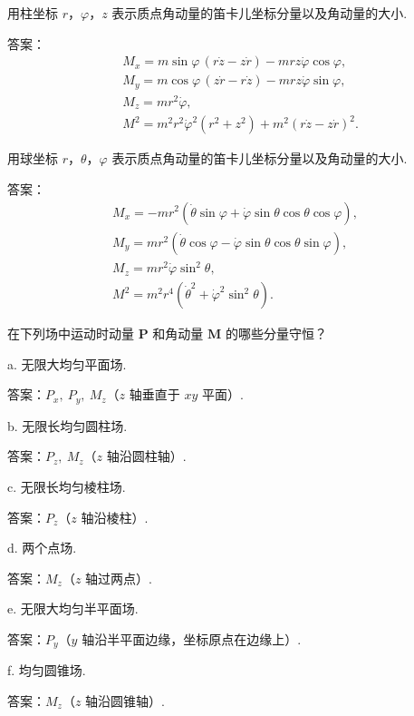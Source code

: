 \begin{xiti}

\quad 用柱坐标 $r$，$\varphi$，$z$ 表示质点角动量的笛卡儿坐标分量以及角动量的大小.

答案：
\begin{equation*}
\begin{aligned}
  &M_x=m\sin\varphi\,(r\dot{z}-z\dot{r})-mrz\dot{\varphi}\cos\varphi,\\
  &M_y=m\cos\varphi\,(z\dot{r}-r\dot{z})-mrz\dot{\varphi}\sin\varphi,\\
  &M_z=mr^2\dot{\varphi},\\
  &M^2=m^2r^2\dot{\varphi}^2\left(r^2+z^2\right)+m^2(r\dot{z}-z\dot{r})^2.
\end{aligned}
\end{equation*}

\quad 用球坐标 $r$，$\theta$，$\varphi$ 表示质点角动量的笛卡儿坐标分量以及角动量的大小.

答案：
\begin{gather*}
  M_x=-mr^2\left(\dot{\theta}\sin\varphi
  +\dot{\varphi}\sin\theta\cos\theta\cos\varphi\right),\\
  M_y=mr^2\left(\dot{\theta}\cos\varphi
  -\dot{\varphi}\sin\theta\cos\theta\sin\varphi\right),\\
  M_z=mr^2\dot{\varphi}\sin^2\theta,\\
  M^2=m^2r^4\left(\dot{\theta}^2+\dot{\varphi}^2\sin^2\theta\right).
\end{gather*}

\quad 在下列场中运动时动量 $\boldsymbol{P}$ 和角动量 $\boldsymbol{M}$ 的哪些分量守恒？

a. 无限大均匀平面场.

答案：$P_x,\ P_y,\ M_z$（$z$ 轴垂直于 $xy$ 平面）.

b. 无限长均匀圆柱场.

答案：$P_z,\ M_z$（$z$ 轴沿圆柱轴）.

c. 无限长均匀棱柱场.

答案：$P_z$（$z$ 轴沿棱柱）.

d. 两个点场.

答案：$M_z$（$z$ 轴过两点）.

e. 无限大均匀半平面场.

答案：$P_y$（$y$ 轴沿半平面边缘，坐标原点在边缘上）.

f. 均匀圆锥场.

答案：$M_z$（$z$ 轴沿圆锥轴）.


\end{xiti}
